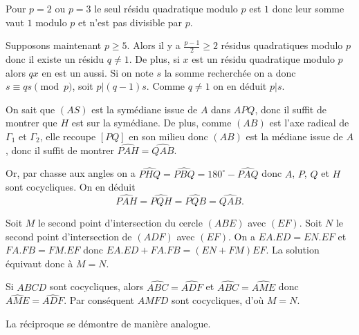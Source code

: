\begin{sol}
Pour $p=2$ ou $p=3$ le seul résidu quadratique modulo $p$ est $1$ donc leur somme vaut $1$ modulo $p$ et n'est pas divisible par $p$.

Supposons maintenant $p \geq 5$. Alors il y a $\frac{p-1}{2} \geq 2$ résidus quadratiques modulo $p$ donc il existe un résidu $q \ne 1$. De plus, si $x$ est un résidu quadratique modulo $p$ alors $qx$ en est un aussi. Si on note $s$ la somme recherchée on a donc $s \equiv qs \pmod{p}$, soit $p | (q-1)s$. Comme $q \ne 1$ on en déduit $p | s$.
\end{sol}

\begin{sol}
On sait que $(AS)$ est la symédiane issue de $A$ dans $APQ$, donc il suffit de montrer que $H$ est sur la symédiane. De plus, comme $(AB)$ est l'axe radical de $\Gamma_1$ et $\Gamma_2$, elle recoupe $[PQ]$ en son milieu donc $(AB)$ est la médiane issue de $A$, donc il suffit de montrer $\widehat{PAH}=\widehat{QAB}$.

Or, par chasse aux angles on a $\widehat{PHQ}=\widehat{PBQ}=180^{\circ}-\widehat{PAQ}$ donc $A$, $P$, $Q$ et $H$ sont cocycliques. On en déduit 
\[\widehat{PAH}=\widehat{PQH}=\widehat{PQB}=\widehat{QAB}.\]
\end{sol}

\begin{sol}
 Soit $M$ le second point d'intersection du cercle $(ABE)$ avec $(EF)$. Soit $N$ le
second point d'intersection de $(ADF)$ avec $(EF)$. On a
$EA.ED=EN.EF$ et $FA.FB=FM.EF$ donc $EA.ED+FA.FB=(EN+FM)EF$. La solution \'equivaut
donc \`a $M=N$.

Si $ABCD$ sont cocycliques, alors $\widehat{ABC}=\widehat{ADF}$ et
$\widehat{ABC}=\widehat{AME}$ donc $\widehat{AME}=\widehat{ADF}$. Par cons\'equent
$AMFD$ sont
cocycliques, d'o\`u $M=N$.

La r\'eciproque se d\'emontre de mani\`ere analogue.
\end{sol}

